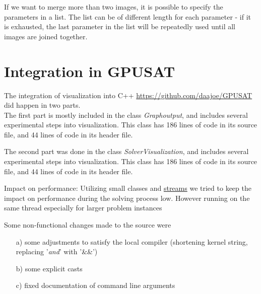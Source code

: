 \documentclass[a4paper, 12pt, bibliography=totoc]{scrartcl}
\begin{document}
If we want to merge more than two images, it is possible to specify the parameters in a list.
The list can be of different length for each parameter - if it is exhausted, the last parameter in the list will be repeatedly used until all images are joined together.

\newpage
\section{Integration in GPUSAT}\label{sec:gpusat}

The integration of visualization into C++ \url{https://github.com/daajoe/GPUSAT} did happen in two parts. \\

The first part is mostly included in the class \textit{Graphoutput}, and includes several experimental steps into visualization. This class has 186 lines of code in its source file, and 44 lines of code in its header file.

The second part was done in the class \textit{SolverVisualization}, and includes several experimental steps into visualization. This class has 186 lines of code in its source file, and 44 lines of code in its header file.

Impact on performance:
Utilizing small classes and \href{http://www.cplusplus.com/reference/sstream/stringstream/}{streams} we tried to keep the impact on performance during the solving process low. However running on the same thread especially for larger problem instances 

Some non-functional changes made to the source were 
\begin{itemize}
	\item[a)] some adjustments to satisfy the local compiler (shortening kernel string, replacing '\emph{and}' with '\&\&')
	\item[b)] some explicit casts
	\item[c)] fixed documentation of command line arguments
\end{itemize}
\end{document}
